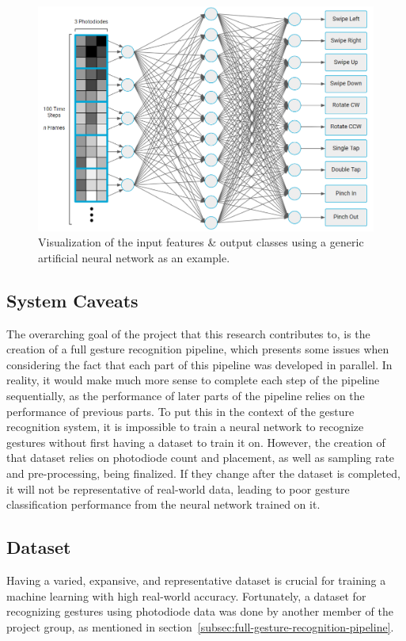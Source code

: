 \begin{figure}[h]
    \centering
    \captionsetup{justification=centering}
    \includegraphics[width=\linewidth]{figures/system_advanced}
    \caption{Visualization of the input features \& output classes using a generic artificial neural network as an example.}
    \label{fig:system}
\end{figure}

\subsection{System Caveats}\label{subsec:system-caveats}
The overarching goal of the project that this research contributes to, is the creation of a full gesture recognition pipeline, which presents some issues when considering the fact that each part of this pipeline was developed in parallel.
In reality, it would make much more sense to complete each step of the pipeline sequentially, as the performance of later parts of the pipeline relies on the performance of previous parts.
To put this in the context of the gesture recognition system, it is impossible to train a neural network to recognize gestures without first having a dataset to train it on.
However, the creation of that dataset relies on photodiode count and placement, as well as sampling rate and pre-processing, being finalized.
If they change after the dataset is completed, it will not be representative of real-world data, leading to poor gesture classification performance from the neural network trained on it.

\subsection{Dataset}\label{subsec:dataset}
Having a varied, expansive, and representative dataset is crucial for training a machine learning with high real-world accuracy.
Fortunately, a dataset for recognizing gestures using photodiode data was done by another member of the project group, as mentioned in section~\ref{subsec:full-gesture-recognition-pipeline}.

